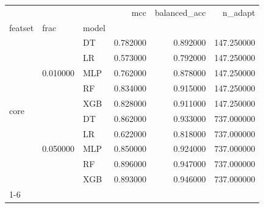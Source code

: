 \begin{tabular}{lllrrr}
\toprule
 &  &  & mcc & balanced_acc & n_adapt \\
featset & frac & model &  &  &  \\
\midrule
\multirow[t]{10}{*}{core} & \multirow[t]{5}{*}{0.010000} & DT & 0.782000 & 0.892000 & 147.250000 \\
 &  & LR & 0.573000 & 0.792000 & 147.250000 \\
 &  & MLP & 0.762000 & 0.878000 & 147.250000 \\
 &  & RF & 0.834000 & 0.915000 & 147.250000 \\
 &  & XGB & 0.828000 & 0.911000 & 147.250000 \\
\cline{2-6}
 & \multirow[t]{5}{*}{0.050000} & DT & 0.862000 & 0.933000 & 737.000000 \\
 &  & LR & 0.622000 & 0.818000 & 737.000000 \\
 &  & MLP & 0.850000 & 0.924000 & 737.000000 \\
 &  & RF & 0.896000 & 0.947000 & 737.000000 \\
 &  & XGB & 0.893000 & 0.946000 & 737.000000 \\
\cline{1-6} \cline{2-6}
\bottomrule
\end{tabular}
